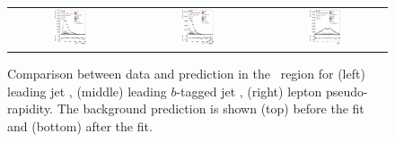 \begin{figure}[tp]
\begin{tabular}{ccc}
  \includegraphics[width=0.27\textwidth]{Analysis/Figures_ttH/tesis_vars/postfit/jet1_pt_6jetin2btagex.eps} &
  \includegraphics[width=0.27\textwidth]{Analysis/Figures_ttH/tesis_vars/postfit/bjet1_pt_6jetin2btagex.eps} &
  \includegraphics[width=0.27\textwidth]{Analysis/Figures_ttH/tesis_vars/postfit/lep_eta_6jetin2btagex.eps} \\
\end{tabular}
\caption{Comparison between data and prediction in the \sixtwo\ region for (left) leading jet \pt, (middle) leading $b$-tagged jet \pt, (right) lepton pseudo-rapidity. The background prediction is shown (top) before the fit and (bottom) after the fit.}
  \label{fig:vars2_sixtwo}
\end{figure}

